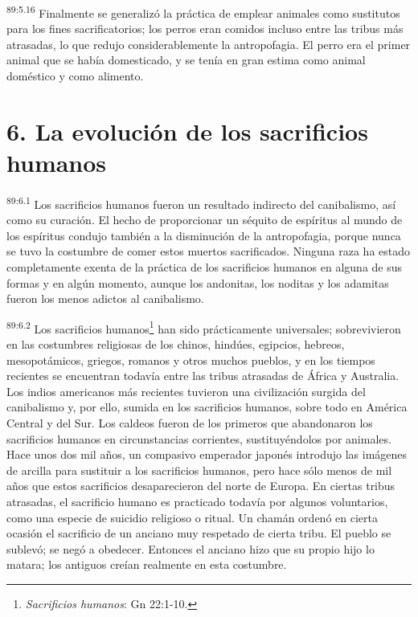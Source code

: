 \documentclass[twoside, 11pt]{book}
\begin{document}
\par
\textsuperscript{89:5.16} Finalmente se generalizó la práctica de emplear animales como sustitutos para los fines sacrificatorios; los perros eran comidos incluso entre las tribus más atrasadas, lo que redujo considerablemente la antropofagia. El perro era el primer animal que se había domesticado, y se tenía en gran estima como animal doméstico y como alimento.

\section*{6. La evolución de los sacrificios humanos}
\par
\textsuperscript{89:6.1} Los sacrificios humanos fueron un resultado indirecto del canibalismo, así como su curación. El hecho de proporcionar un séquito de espíritus al mundo de los espíritus condujo también a la disminución de la antropofagia, porque nunca se tuvo la costumbre de comer estos muertos sacrificados. Ninguna raza ha estado completamente exenta de la práctica de los sacrificios humanos en alguna de sus formas y en algún momento, aunque los andonitas, los noditas y los adamitas fueron los menos adictos al canibalismo.

\par
\textsuperscript{89:6.2} Los sacrificios humanos\footnote{\textit{Sacrificios humanos}: Gn 22:1-10.} han sido prácticamente universales; sobrevivieron en las costumbres religiosas de los chinos, hindúes, egipcios, hebreos, mesopotámicos, griegos, romanos y otros muchos pueblos, y en los tiempos recientes se encuentran todavía entre las tribus atrasadas de África y Australia. Los indios americanos más recientes tuvieron una civilización surgida del canibalismo y, por ello, sumida en los sacrificios humanos, sobre todo en América Central y del Sur. Los caldeos fueron de los primeros que abandonaron los sacrificios humanos en circunstancias corrientes, sustituyéndolos por animales. Hace unos dos mil años, un compasivo emperador japonés introdujo las imágenes de arcilla para sustituir a los sacrificios humanos, pero hace sólo menos de mil años que estos sacrificios desaparecieron del norte de Europa. En ciertas tribus atrasadas, el sacrificio humano es practicado todavía por algunos voluntarios, como una especie de suicidio religioso o ritual. Un chamán ordenó en cierta ocasión el sacrificio de un anciano muy respetado de cierta tribu. El pueblo se sublevó; se negó a obedecer. Entonces el anciano hizo que su propio hijo lo matara; los antiguos creían realmente en esta costumbre.
\end{document}

